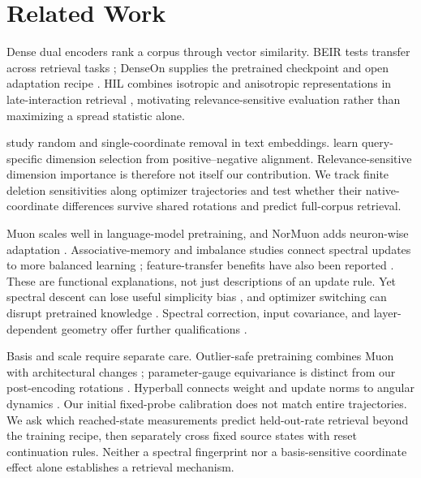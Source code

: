 \section{Related Work}

Dense dual encoders rank a corpus through vector similarity. BEIR tests transfer across
retrieval tasks \citep{thakur2021beir}; DenseOn supplies the pretrained checkpoint and open
adaptation recipe \citep{sourty2026denseon}. HIL combines isotropic and anisotropic
representations in late-interaction retrieval \citep{kim2024hil}, motivating relevance-sensitive
evaluation rather than maximizing a spread statistic alone.

\citet{takeshita2025dimensions} study random and single-coordinate removal in text embeddings.
\citet{wu2026select} learn query-specific dimension selection from positive--negative
alignment. Relevance-sensitive dimension importance is therefore not itself our contribution.
We track finite deletion sensitivities along optimizer trajectories and test whether their
native-coordinate differences survive shared rotations and predict full-corpus retrieval.

Muon scales well in language-model pretraining, and NorMuon adds neuron-wise adaptation
\citep{liu2025muon,li2025normuon}. Associative-memory and imbalance studies connect spectral
updates to more balanced learning \citep{wang2025tailmemory,vasudeva2025spectral}; feature-transfer
benefits have also been reported \citep{ruan2026features}. These are functional explanations,
not just descriptions of an update rule. Yet spectral descent can lose useful simplicity
bias \citep{dragutinovic2026simplicity}, and optimizer switching can disrupt pretrained
knowledge \citep{qu2026finetune,liu2026consistency}. Spectral correction, input covariance,
and layer-dependent geometry offer further qualifications
\citep{pang2026htmuon,du2026newtonmuon,massena2026schatten}.

Basis and scale require separate care. Outlier-safe pretraining combines Muon with architectural
changes \citep{park2025outlier}; parameter-gauge equivariance is distinct from our post-encoding
rotations \citep{singh2026basis}. Hyperball connects weight and update norms to angular dynamics
\citep{wen2026hyperball}. Our initial fixed-probe calibration does not match entire trajectories.
We ask which reached-state measurements predict held-out-rate retrieval beyond the training
recipe, then separately cross fixed source states with reset continuation rules. Neither a
spectral fingerprint nor a basis-sensitive coordinate effect alone establishes a retrieval
mechanism.
